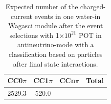 \begin{table}[htb]
  \begin{center}
    \caption{Expected number of the charged-current events in one water-in Wagasci module after the event selections with 1$\times 10^{21}$ POT in antineutrino-mode with a classification based on  particles after final state interactions.}
    \begin{tabular}{ccc|c} \hline
CC0$\pi$ & CC1$\pi$ & CCn$\pi$  & Total \\ \hline
2529.3 & 520.0 &  & \\
\hline
    \end{tabular}
    \label{tab:expected_num_ccfsi_events_antineutrino_beam}
  \end{center}
\end{table}


% 


